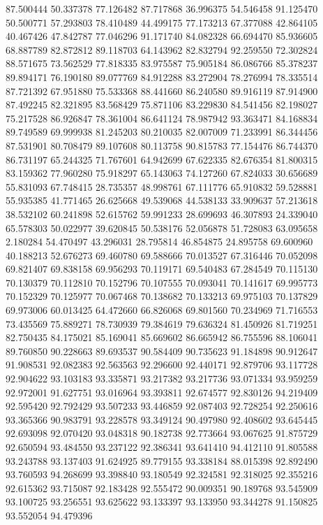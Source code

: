 87.500444
50.337378
77.126482
87.717868
36.996375
54.546458
91.125470
50.500771
57.293803
78.410489
44.499175
77.173213
67.377088
42.864105
40.467426
47.842787
77.046296
91.171740
84.082328
66.694470
85.936605
68.887789
82.872812
89.118703
64.143962
82.832794
92.259550
72.302824
88.571675
73.562529
77.818335
83.975587
75.905184
86.086766
85.378237
89.894171
76.190180
89.077769
84.912288
83.272904
78.276994
78.335514
87.721392
67.951880
75.533368
88.441660
86.240580
89.916119
87.914900
87.492245
82.321895
83.568429
75.871106
83.229830
84.541456
82.198027
75.217528
86.926847
78.361004
86.641124
78.987942
93.363471
84.168834
89.749589
69.999938
81.245203
80.210035
82.007009
71.233991
86.344456
87.531901
80.708479
89.107608
80.113758
90.815783
77.154476
86.744370
86.731197
65.244325
71.767601
64.942699
67.622335
82.676354
81.800315
83.159362
77.960280
75.918297
65.143063
74.127260
67.824033
30.656689
55.831093
67.748415
28.735357
48.998761
67.111776
65.910832
59.528881
55.935385
41.771465
26.625668
49.539068
44.538133
33.909637
57.213618
38.532102
60.241898
52.615762
59.991233
28.699693
46.307893
24.339040
65.578303
50.022977
39.620845
50.538176
52.056878
51.728083
63.095658
2.180284
54.470497
43.296031
28.795814
46.854875
24.895758
69.600960
40.188213
52.676273
69.460780
69.588666
70.013527
67.316446
70.052098
69.821407
69.838158
69.956293
70.119171
69.540483
67.284549
70.115130
70.130379
70.112810
70.152796
70.107555
70.093041
70.141617
69.995773
70.152329
70.125977
70.067468
70.138682
70.133213
69.975103
70.137829
69.973006
60.013425
64.472660
66.826068
69.801560
70.234969
71.716553
73.435569
75.889271
78.730939
79.384619
79.636324
81.450926
81.719251
82.750435
84.175021
85.169041
85.669602
86.665942
86.755596
88.106041
89.760850
90.228663
89.693537
90.584409
90.735623
91.184898
90.912647
91.908531
92.082383
92.563563
92.296600
92.440171
92.879706
93.117728
92.904622
93.103183
93.335871
93.217382
93.217736
93.071334
93.959259
92.972001
91.627751
93.016964
93.393811
92.674577
92.830126
94.219409
92.595420
92.792429
93.507233
93.446859
92.087403
92.728254
92.250616
93.365366
90.983791
93.228578
93.349124
90.497980
92.408602
93.645445
92.693098
92.070420
93.048318
90.182738
92.773664
93.067625
91.875729
92.650594
93.484550
93.237122
92.386341
93.641410
94.412110
91.805588
93.243788
93.137403
91.624925
89.779155
93.338184
88.015398
92.892490
93.760593
94.268699
93.398840
93.180549
92.324581
92.318025
92.355216
92.615362
93.715087
92.183428
92.555472
90.009351
90.189768
93.545909
93.100725
93.256551
93.625622
93.133397
93.133950
93.344278
91.150825
93.552054
94.479396
